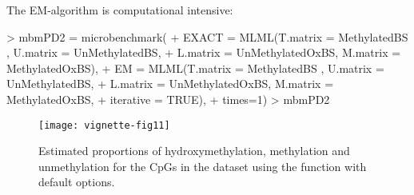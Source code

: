 \documentclass{article}
\begin{document}
The EM-algorithm is computational intensive:

\begin{Schunk}
\begin{Sinput}
> mbmPD2 = microbenchmark(
+   EXACT = MLML(T.matrix = MethylatedBS , U.matrix = UnMethylatedBS,
+                L.matrix = UnMethylatedOxBS, M.matrix = MethylatedOxBS),
+   EM = MLML(T.matrix = MethylatedBS , U.matrix = UnMethylatedBS,
+             L.matrix = UnMethylatedOxBS, M.matrix = MethylatedOxBS,
+             iterative = TRUE),
+   times=1)
> mbmPD2
\end{Sinput}
\end{Schunk}




\begin{figure*}[h]
 \texttt{[image: vignette-fig11]}
 \caption{\label{fig:fig11} Estimated proportions of hydroxymethylation, methylation and unmethylation for the CpGs in the dataset using the  function with default options.}
\end{figure*}




%
%
%
%
\end{document}
